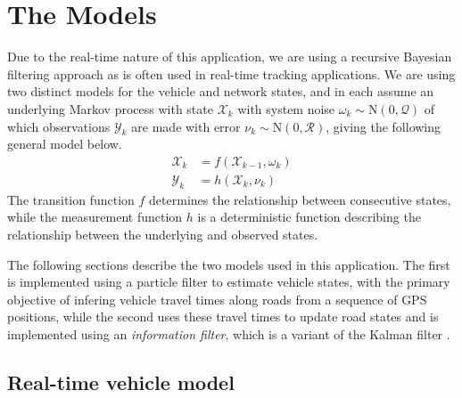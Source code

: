\section{The Models}
\label{sec:models}

Due to the real-time nature of this application, we are using
a recursive Bayesian filtering approach as is often used in
real-time tracking applications.
We are using two distinct models for the vehicle and network states,
and in each assume an underlying Markov process with state $\mathcal{X}_k$
with system noise $\omega_k\sim\mathrm{N}(0,\mathcal{Q})$ 
of which observations $\mathcal{Y}_k$ are made
with error $\nu_k\sim\mathrm{N}(0,\mathcal{R})$,
giving the following general model below.
\begin{equation}
\label{eq:rbe_model}
\begin{split}
\mathcal{X}_k &= f(\mathcal{X}_{k-1}, \omega_k) \\
\mathcal{Y}_k &= h(\mathcal{X}_k, \nu_k)
\end{split}
\end{equation}
The transition function $f$ determines the relationship between consecutive states,
while the measurement function $h$ is a deterministic function describing the
relationship between the underlying and observed states.

The following sections describe the two models used in this application.
The first is implemented using a particle filter to estimate vehicle states,
with the primary objective of infering vehicle travel times along roads
from a sequence of GPS positions,
while the second uses these travel times to update road states 
and is implemented using an \emph{information filter},
which is a variant of the Kalman filter \citep{}.

\subsection{Real-time vehicle model}
\label{sec:pf}

